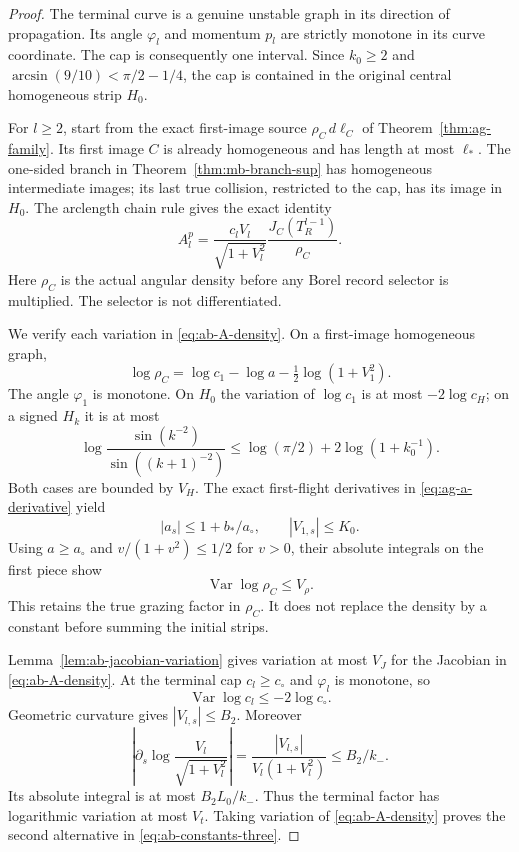 \begin{proof}
The terminal curve is a genuine unstable graph in its direction of
propagation.  Its angle $\varphi_l$ and momentum $p_l$ are strictly
monotone in its curve coordinate.  The cap is consequently one interval.
Since $k_0\ge2$ and
$\arcsin(9/10)<\pi/2-1/4$, the cap is contained in the original
central homogeneous strip $H_0$.

For $l\ge2$, start from the exact first-image source
$\rho_C\,d\ell_C$ of Theorem~\ref{thm:ag-family}.  Its first image
$C$ is already homogeneous and has length at most $\ell_*$.  The
one-sided branch in Theorem~\ref{thm:mb-branch-sup} has homogeneous
intermediate images; its last true collision, restricted to the cap,
has its image in $H_0$.  The arclength chain rule gives the exact
identity
\begin{equation}\label{eq:ab-A-density}
 A_l^p
 =\frac{c_lV_l}{\sqrt{1+V_l^2}}
          \frac{J_C(T_R^{l-1})}{\rho_C}.
\end{equation}
Here $\rho_C$ is the actual angular density before any Borel record
selector is multiplied.  The selector is not differentiated.

We verify each variation in \eqref{eq:ab-A-density}.  On a first-image
homogeneous graph,
\[
 \log\rho_C=\log c_1-\log a-\tfrac12\log(1+V_1^2).
\]
The angle $\varphi_1$ is monotone.  On $H_0$ the variation of
$\log c_1$ is at most $-2\log c_H$; on a signed $H_k$ it is at
most
\[
 \log\!\frac{\sin(k^{-2})}{\sin((k+1)^{-2})}
 \le\log(\pi/2)+2\log(1+k_0^{-1}).
\]
Both cases are bounded by $V_H$.  The exact first-flight derivatives
in \eqref{eq:ag-a-derivative} yield
\[
 |a_s|\le1+b_*/a_\circ,
 \qquad |V_{1,s}|\le K_0.
\]
Using $a\ge a_\circ$ and $v/(1+v^2)\le1/2$ for $v>0$, their
absolute integrals on the first piece show
\[
                 \operatorname{Var}\log\rho_C\le V_\rho.
\]
This retains the true grazing factor in $\rho_C$.  It does not
replace the density by a constant before summing the initial strips.

Lemma~\ref{lem:ab-jacobian-variation} gives variation at most $V_J$
for the Jacobian in \eqref{eq:ab-A-density}.  At the terminal cap
$c_l\ge c_\circ$ and $\varphi_l$ is monotone, so
\[
 \operatorname{Var}\log c_l\le-2\log c_\circ.
\]
Geometric curvature gives $|V_{l,s}|\le B_2$.  Moreover
\[
 \left|\partial_s\log\frac{V_l}{\sqrt{1+V_l^2}}\right|
       =\frac{|V_{l,s}|}{V_l(1+V_l^2)}\le B_2/k_-.
\]
Its absolute integral is at most $B_2L_0/k_-$.  Thus the terminal
factor has logarithmic variation at most $V_t$.  Taking variation
of \eqref{eq:ab-A-density} proves the second alternative in
\eqref{eq:ab-constants-three}.


\end{proof}
